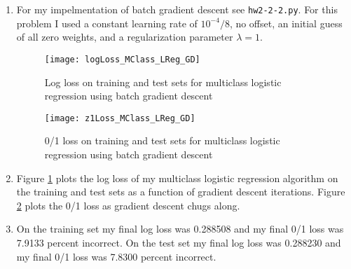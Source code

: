 \documentclass{article}
\begin{document}
\begin{enumerate}
	\item For my impelmentation of batch gradient descent see \texttt{hw2-2-2.py}. For this problem I used a constant learning rate of $10^{-4} / 8$, no offset, an initial guess of all zero weights, and a regularization parameter $\lambda=1$.

	\begin{figure}
        \centering
        \texttt{[image: logLoss\_MClass\_LReg\_GD]}
        \caption{Log loss on training and test sets for multiclass logistic regression using batch gradient descent} 
        \label{fig:2.2log}
    \end{figure}
    \begin{figure}
        \centering
        \texttt{[image: z1Loss\_MClass\_LReg\_GD]}
        \caption{0/1 loss on training and test sets for multiclass logistic regression using batch gradient descent} 
        \label{fig:2.2z1}
    \end{figure}

	\item Figure \ref{fig:2.2log} plots the log loss of my multiclass logistic regression algorithm on the training and test sets as a function of gradient descent iterations. Figure \ref{fig:2.2z1} plots the 0/1 loss as gradient descent chugs along.

	\item On the training set my final log loss was 0.288508 and my final 0/1 loss was 7.9133 percent incorrect. On the test set my final log loss was 0.288230 and my final 0/1 loss was 7.8300 percent incorrect.

\end{enumerate}
\end{document}
